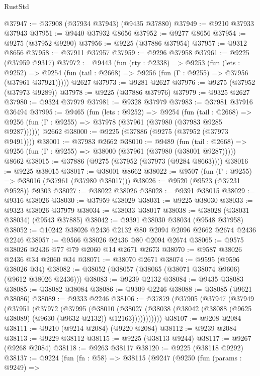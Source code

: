 \begin{lexlean}{RustStd}
\begin{coremodule}
@37947 := @37908 (@37934 @37943) (@9435 @37880)
@37949 := @9210 @37933 @37943
@37951 := @9440 @37932 @8656
@37952 := @9277 @8656
@37954 := @9275 (@37952 @9290)
@37956 := @9225 (@37886 @37954)
@37957 := @9312 @8656
@37958 := @37911 @37957
@37959 := @9296 @37958
@37961 := @9225 (@37959 @9317)
@37972 := @9443
    (fun (rty : @2338) =>
    @9253
      (fun (lets : @9252) =>
      @9254 (fun (tail : @2668) => @9256 (fun (Γ : @9255) => @37956 (@37961 @37921)))))
    @2627
@37973 := @9281 @2627
@37976 := @9275 (@37952 (@37973 @9289))
@37978 := @9225 (@37886 @37976)
@37979 := @9325 @2627
@37980 := @9324 @37979
@37981 := @9328 @37979
@37983 := @37981 @37916 @36494
@37995 := @9465
    (fun (lets : @9252) =>
    @9254
      (fun (tail : @2668) =>
      @9256 (fun (Γ : @9255) => @37978 (@37961 (@37980 (@37983 @9285 @9287))))))
    @2662
@38000 := @9225 (@37886 (@9275 (@37952 (@37973 @9491))))
@38001 := @37983 @2662
@38010 := @9489
    (fun (tail : @2668) => @9256 (fun (Γ : @9255) => @38000 (@37961 (@37980 (@38001 @9287)))))
    @8662
@38015 := @37886 (@9275 (@37952 (@37973 (@9284 @8663))))
@38016 := @9225 @38015
@38017 := @38001 @8662
@38022 := @9507 (fun (Γ : @9255) => @38016 (@37961 (@37980 @38017)))
@38026 := @9520 (@9523 (@37231 @9528)) @9303
@38027 := @38022 @38026
@38028 := @9391 @38015
@38029 := @9316 @38026
@38030 := @37959 @38029
@38031 := @9225 @38030
@38033 := @9323 @38026 @37979
@38034 := @38033 @38017
@38038 := @38028 (@38031 @38034) (@9543 @37885)
@38042 := @9391 @38030 @38034 (@9548 @37958)
@38052 := @10242 @38026 @2436 @2132 @80 @2094 @2096 @2662 @2674 @2436 @2246
@38057 := @9566 @38026 @2436 @80 @2094 @2674
@38065 := @9575 @38026 @2436 @77 @79 @2060 @14 @2671 @2673
@38070 := @9587 @38026 @2436 @34 @2060 @34
@38071 := @38070 @2671
@38074 := @9595 (@9596 @38026 @34)
@38082 := @38052 (@38057 (@38065 (@38071 @38074 @9606) (@9612 @38026 @2436)))
@38083 := @9239 @2132
@38084 := @9435 @38083
@38085 := @38082 @38084
@38086 := @9309 @2246
@38088 := @38085 (@9621 @38086)
@38089 := @9333 @2246
@38106 := @37879
    (@37905
      (@37947
        (@37949
          (@37951
            (@37972
              (@37995
                (@38010
                  (@38027
                    (@38038 (@38042 (@38088 (@9625 @38089) (@9630 (@9632 @2132)) @12163)))))))))))
@38107 := @9208 @2084
@38111 := @9210 (@9214 @2084) (@9220 @2084)
@38112 := @9239 @2084
@38113 := @9229 @38112
@38115 := @9225 (@38113 @9244)
@38117 := @9267 (@9268 @2084)
@38118 := @9263 @38117
@38120 := @9225 (@38118 @9292)
@38137 := @9224
    (fun (fn : @58) =>
    @38115
      (@9247
        (@9250
          (fun (params : @9249) =>

\end{coremodule}
\end{lexlean}
